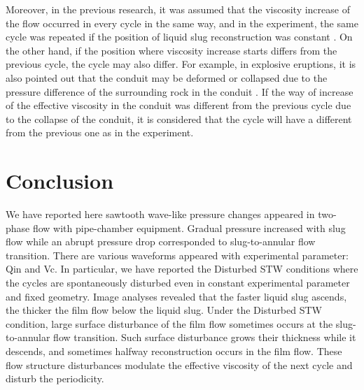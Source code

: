 \documentclass[aps,pre,preprint,groupedaddress,showkeys]{revtex4-2}
\begin{document}
Moreover, in the previous research, it was assumed that the viscosity increase of the flow occurred in every cycle in the same way, and in the experiment, the same cycle was repeated if the position of liquid slug reconstruction was constant \citep{Melnik2005b, Kozono2012}.
On the other hand, if the position where viscosity increase starts differs from the previous cycle, the cycle may also differ.
For example, in explosive eruptions, it is also pointed out that the conduit may be deformed or collapsed due to the pressure difference of the surrounding rock in the conduit \citep{Dobran1992, Costa2009a}.
If the way of increase of the effective viscosity in the conduit was different from the previous cycle due to the collapse of the conduit, it is considered that the cycle will have a different from the previous one as in the experiment.

\section{Conclusion}\label{con}
We have reported here sawtooth wave-like pressure changes appeared in two-phase flow with pipe-chamber equipment.
Gradual pressure increased with slug flow while an abrupt pressure drop corresponded to slug-to-annular flow transition.
There are various waveforms appeared with experimental parameter: Qin and Vc.
In particular, we have reported the Disturbed STW conditions where the cycles are spontaneously disturbed even in constant experimental parameter and fixed geometry.
Image analyses revealed that the faster liquid slug ascends, the thicker the film flow below the liquid slug.
Under the Disturbed STW condition, large surface disturbance of the film flow sometimes occurs at the slug-to-annular flow transition.
Such surface disturbance grows their thickness while it descends, and sometimes halfway reconstruction occurs in the film flow.
These flow structure disturbances modulate the effective viscosity of the next cycle and disturb the periodicity.
\end{document}
